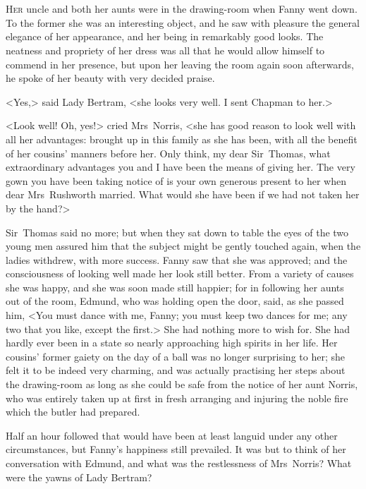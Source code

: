 \chapter[Chapter \thechapter]{} 

 \lettrine[lraise=0.3]{H}{er} uncle and both her aunts were in the drawing-room when Fanny went down. To the former she was an interesting object, and he saw with pleasure the general elegance of her appearance, and her being in remarkably good looks. The neatness and propriety of her dress was all that he would allow himself to commend in her presence, but upon her leaving the room again soon afterwards, he spoke of her beauty with very decided praise.

<Yes,> said Lady Bertram, <she looks very well. I sent Chapman to her.>

<Look well! Oh, yes!> cried Mrs~Norris, <she has good reason to look well with all her advantages: brought up in this family as she has been, with all the benefit of her cousins' manners before her. Only think, my dear Sir~Thomas, what extraordinary advantages you and I have been the means of giving her. The very gown you have been taking notice of is your own generous present to her when dear Mrs~Rushworth married. What would she have been if we had not taken her by the hand?>

Sir~Thomas said no more; but when they sat down to table the eyes of the two young men assured him that the subject might be gently touched again, when the ladies withdrew, with more success. Fanny saw that she was approved; and the consciousness of looking well made her look still better. From a variety of causes she was happy, and she was soon made still happier; for in following her aunts out of the room, Edmund, who was holding open the door, said, as she passed him, <You must dance with me, Fanny; you must keep two dances for me; any two that you like, except the first.> She had nothing more to wish for. She had hardly ever been in a state so nearly approaching high spirits in her life. Her cousins' former gaiety on the day of a ball was no longer surprising to her; she felt it to be indeed very charming, and was actually practising her steps about the drawing-room as long as she could be safe from the notice of her aunt Norris, who was entirely taken up at first in fresh arranging and injuring the noble fire which the butler had prepared.

Half an hour followed that would have been at least languid under any other circumstances, but Fanny's happiness still prevailed. It was but to think of her conversation with Edmund, and what was the restlessness of Mrs~Norris? What were the yawns of Lady Bertram?

